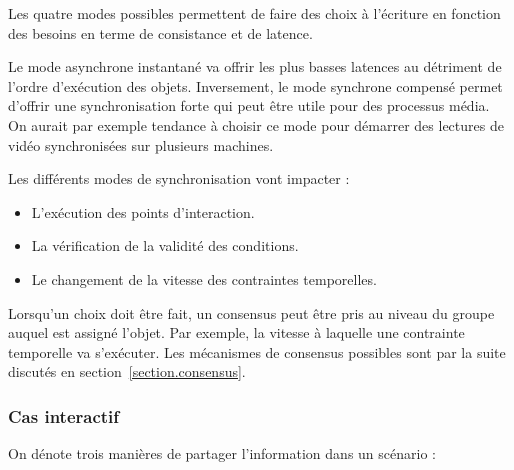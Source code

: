 \documentclass[10pt]{article}
\newcommand\triggers{points d'interaction\xspace}
\begin{document}
Les quatre modes possibles permettent de faire des choix à l'écriture en fonction des besoins en terme de consistance et de latence.

Le mode asynchrone instantané va offrir les plus basses latences au détriment de l'ordre d'exécution des objets.
Inversement, le mode synchrone compensé permet d'offrir une synchronisation forte qui peut être utile pour des processus média. 
On aurait par exemple tendance à choisir ce mode pour démarrer des lectures de vidéo synchronisées sur plusieurs machines.

Les différents modes de synchronisation vont impacter : 
\begin{itemize}
    \item L'exécution des \triggers.
    \item La vérification de la validité des conditions.
    \item Le changement de la vitesse des contraintes temporelles.
\end{itemize}

Lorsqu'un choix doit être fait, un consensus peut être pris au niveau du groupe auquel est assigné l'objet. 
Par exemple, la vitesse à laquelle une contrainte temporelle va s'exécuter.
Les mécanismes de consensus possibles sont par la suite discutés en section~\ref{section.consensus}.

\subsubsection{Cas interactif}
On dénote trois manières de partager l'information dans un scénario : 
\end{document}
